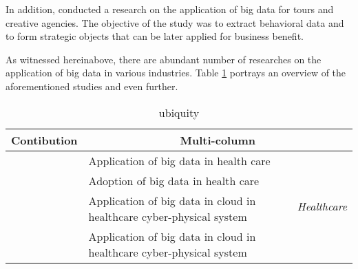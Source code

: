 In addition, \cite{Zhang2019a} conducted a research on the application of big data for tours and creative agencies. The objective of the study was to extract behavioral data and to form strategic objects that can be later applied for business benefit.

As witnessed hereinabove, there are abundant number of researches on the application of big data in various industries. Table \ref{table:ubiquity} portrays an overview of the aforementioned studies and even further.

\begin{center}
    \renewcommand{\arraystretch}{1.5}
    \begin{longtable}{|p{4cm}|p{8cm}|p{1cm}|}
        \caption{ubiquity}                                                       \label{table:ubiquity}                                                                                                                          \\
        \hline
        Contibution                & \multicolumn{2}{c|}{Multi-column}                                                                                                                                                           \\
        \hline
        \cite{Luo2016}             & Application of big data in health care                                                                                                        & \multirow{10}{*}{\begin{turn}{-90} \textit{Healthcare} \end{turn}} \\

        \cite{Murdoch2013}         & Adoption of big data in health care                                                                                                           &                                             \\

        \cite{Zhang2015}           & Application of big data in cloud in healthcare cyber-physical system                                                                          &                                             \\

        \cite{Zhang2015}           & Application of big data in cloud in healthcare cyber-physical system                                                                          &                                             \\


\end{longtable}
\end{center}
